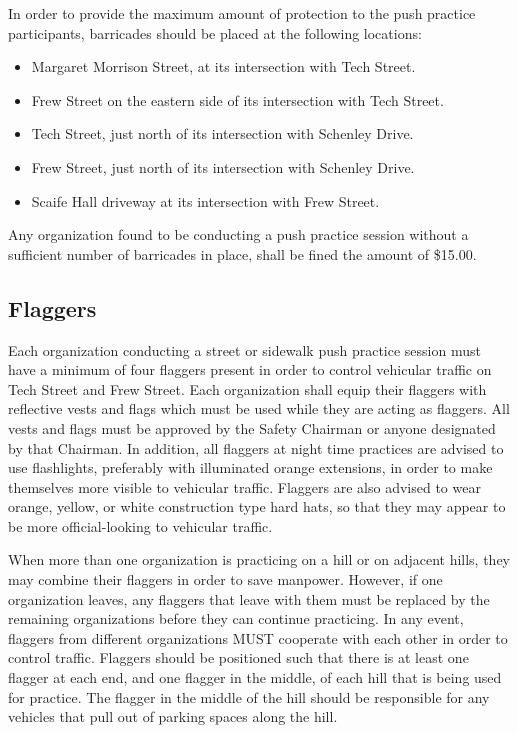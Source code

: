 	In order to provide the maximum amount of protection to the push practice
	participants, barricades should be placed at the following locations:

	\begin{itemize}

		\item Margaret Morrison Street, at its intersection with Tech Street.

		\item Frew Street on the eastern side of its intersection with Tech
		Street.

		\item Tech Street, just north of its intersection with Schenley Drive.

		\item Frew Street, just north of its intersection with Schenley Drive.

		\item Scaife Hall driveway at its intersection with Frew Street.

	\end{itemize}

	Any organization found to be conducting a push practice session without a
	sufficient number of barricades in place, shall be fined the amount of \$15.00.

\subsection{Flaggers}

	Each organization conducting a street or sidewalk push practice session must
	have a minimum of four flaggers present in order to control vehicular traffic
	on Tech Street and Frew Street. Each organization shall equip their flaggers
	with reflective vests and flags which must be used while they are acting as
	flaggers. All vests and flags must be approved by the Safety Chairman or anyone
	designated by that Chairman. In addition, all flaggers at night time practices
	are advised to use flashlights, preferably with illuminated orange extensions,
	in order to make themselves more visible to vehicular traffic. Flaggers are
	also advised to wear orange, yellow, or white construction type hard hats, so
	that they may appear to be more official-looking to vehicular traffic.

	When more than one organization is practicing on a hill or on adjacent hills,
	they may combine their flaggers in order to save manpower. However, if one
	organization leaves, any flaggers that leave with them must be replaced by the
	remaining organizations before they can continue practicing. In any event,
	flaggers from different organizations MUST cooperate with each other in order
	to control traffic. Flaggers should be positioned such that there is at least
	one flagger at each end, and one flagger in the middle, of each hill that is
	being used for practice. The flagger in the middle of the hill should be
	responsible for any vehicles that pull out of parking spaces along the hill.

